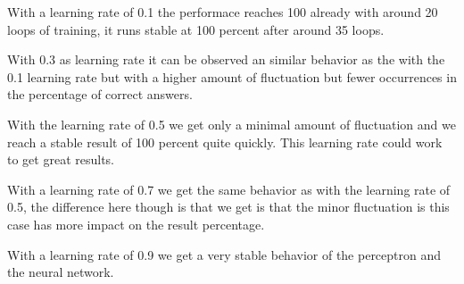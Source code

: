 \documentclass[a4paper, 12pt]{article}
\begin{document}
With a learning rate of 0.1 the performace reaches 100 already with around 20 loops of training, it runs stable at 100 percent after around 35 loops.


With 0.3 as learning rate it can be observed an similar behavior as the with the 0.1 learning rate but with a higher amount of fluctuation but fewer occurrences in the percentage of correct answers.


With the learning rate of 0.5 we get only a minimal amount of fluctuation and we reach a stable result of 100 percent quite quickly. This learning rate could work to get great results.


With a learning rate of 0.7 we get the same behavior as with the learning rate of 0.5, the difference here though is that we get is that the minor fluctuation is this case has more impact on the result percentage.


With a learning rate of 0.9 we get a very stable behavior of the perceptron and the neural network.
\end{document}
